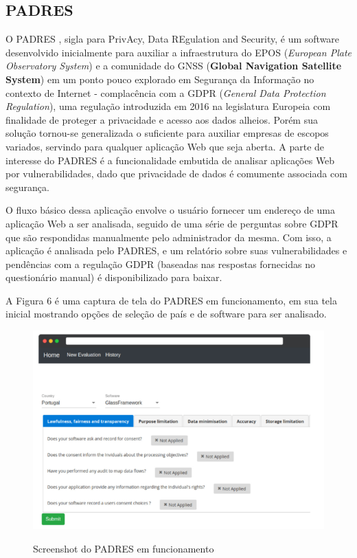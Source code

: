 \subsection{PADRES}

O PADRES \cite{pereira_padres_2022}, sigla para PrivAcy, Data REgulation and Security, é um software desenvolvido inicialmente para auxiliar a infraestrutura do EPOS (\textit{European Plate Observatory System}) e a comunidade do GNSS (\textbf{Global Navigation Satellite System}) em um ponto pouco explorado em Segurança da Informação no contexto de Internet - complacência com a GDPR (\textit{General Data Protection Regulation}), uma regulação introduzida em 2016 na legislatura Europeia com finalidade de proteger a privacidade e acesso aos dados alheios. Porém sua solução tornou-se generalizada o suficiente para auxiliar empresas de escopos variados, servindo para qualquer aplicação Web que seja aberta. A parte de interesse do PADRES é a funcionalidade embutida de analisar aplicações Web por vulnerabilidades, dado que privacidade de dados é comumente associada com segurança.

O fluxo básico dessa aplicação envolve o usuário fornecer um endereço de uma aplicação Web a ser analisada, seguido de uma série de perguntas sobre GDPR que são respondidas manualmente pelo administrador da mesma. Com isso, a aplicação é analisada pelo PADRES, e um relatório sobre suas vulnerabilidades e pendências com a regulação GDPR (baseadas nas respostas fornecidas no questionário manual) é disponibilizado para baixar. 

A Figura 6 é uma captura de tela do PADRES em funcionamento, em sua tela inicial mostrando opções de seleção de país e de software para ser analisado.

\begin{figure}[ht]
    \centering
    \caption{Screenshot do PADRES em funcionamento}
    \includegraphics[width=14cm]{figuras/padres.png} 
    \label{fig:internet} 
\end{figure}

